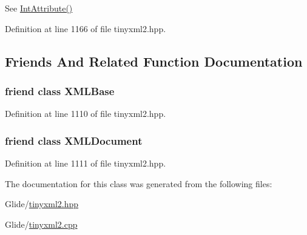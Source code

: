 See \hyperlink{classtinyxml2_1_1_x_m_l_element_af86f05771c11a73a2896b662bb589ef5}{Int\-Attribute()} 



Definition at line 1166 of file tinyxml2.\-hpp.



\subsection{Friends And Related Function Documentation}
\hypertarget{classtinyxml2_1_1_x_m_l_element_a449202cfc89e7ae5c2f81995476f9ec1}{
\subsubsection[{X\-M\-L\-Base}]{\setlength{\rightskip}{0pt plus 5cm}friend class X\-M\-L\-Base\hspace{0.3cm}{\ttfamily [friend]}}}\label{classtinyxml2_1_1_x_m_l_element_a449202cfc89e7ae5c2f81995476f9ec1}


Definition at line 1110 of file tinyxml2.\-hpp.

\hypertarget{classtinyxml2_1_1_x_m_l_element_a4eee3bda60c60a30e4e8cd4ea91c4c6e}{
\subsubsection[{X\-M\-L\-Document}]{\setlength{\rightskip}{0pt plus 5cm}friend class {\bf X\-M\-L\-Document}\hspace{0.3cm}{\ttfamily [friend]}}}\label{classtinyxml2_1_1_x_m_l_element_a4eee3bda60c60a30e4e8cd4ea91c4c6e}


Definition at line 1111 of file tinyxml2.\-hpp.



The documentation for this class was generated from the following files\-:\begin{DoxyCompactItemize}
\item 
Glide/\hyperlink{tinyxml2_8hpp}{tinyxml2.\-hpp}\item 
Glide/\hyperlink{tinyxml2_8cpp}{tinyxml2.\-cpp}\end{DoxyCompactItemize}
